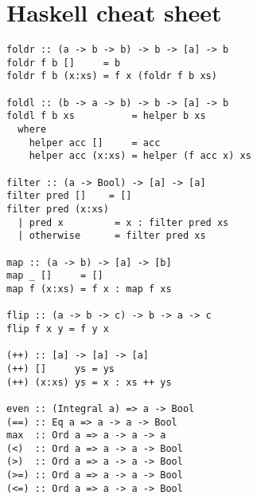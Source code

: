\documentclass[paper=letter, fontsize=13pt]{article} %
\numberwithin{equation}{section} %
\begin{document}
\section{Haskell cheat sheet}
\begin{lstlisting}
foldr :: (a -> b -> b) -> b -> [a] -> b
foldr f b []     = b
foldr f b (x:xs) = f x (foldr f b xs)

foldl :: (b -> a -> b) -> b -> [a] -> b
foldl f b xs          = helper b xs
  where
    helper acc []     = acc
    helper acc (x:xs) = helper (f acc x) xs

filter :: (a -> Bool) -> [a] -> [a]
filter pred []    = []
filter pred (x:xs)
  | pred x         = x : filter pred xs
  | otherwise      = filter pred xs

map :: (a -> b) -> [a] -> [b]
map _ []     = []
map f (x:xs) = f x : map f xs

flip :: (a -> b -> c) -> b -> a -> c
flip f x y = f y x

(++) :: [a] -> [a] -> [a]
(++) []     ys = ys
(++) (x:xs) ys = x : xs ++ ys

even :: (Integral a) => a -> Bool
(==) :: Eq a => a -> a -> Bool
max  :: Ord a => a -> a -> a
(<)  :: Ord a => a -> a -> Bool
(>)  :: Ord a => a -> a -> Bool
(>=) :: Ord a => a -> a -> Bool
(<=) :: Ord a => a -> a -> Bool
\end{lstlisting}
\end{document}
